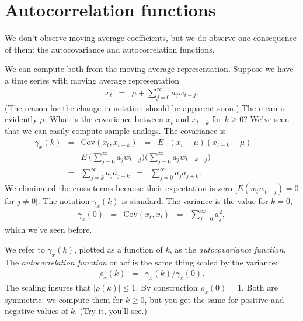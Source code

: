 \documentclass[11pt]{article}
\begin{document}
\section{Autocorrelation functions}

We don't observe moving average coefficients,
but we do observe one consequence of them:
the autocovariance and autocorrelation functions.


We can compute both from the moving average representation.
Suppose we have a time series with moving average representation
\begin{eqnarray*}
    x_t &=& \mu + \sum_{j=0}^\infty a_j w_{t-j} .
\end{eqnarray*}
(The reason for the change in notation should be apparent soon.)
The mean is evidently $\mu$.
What is the covariance between $x_t$ and $x_{t-k}$ for $k \geq 0$?
We've seen that we can easily compute sample analogs.
The covariance is
\begin{eqnarray*}
    \gamma_x(k)  &=& \mbox{Cov} (x_t,x_{t-k}) \;\;=\;\;
                 E \left[ (x_t - \mu) (x_{t-k} - \mu)\right] \phantom{\sum}\\
                &=&  E \ \Big( \sum_{j=0}^\infty a_j w_{t-j} \Big)
                  \Big( \sum_{j=0}^\infty a_j w_{t-k-j} \Big) \\
                &=&   \sum_{j=k}^\infty a_j a_{j-k}
                \;\;=\;\; \sum_{j=0}^\infty a_j a_{j+k} .
\end{eqnarray*}
We eliminated the cross terms because their expectation is zero
[$E (w_t w_{t-j}) = 0$ for $j\neq 0$].
The notation $\gamma_x(k)$ is standard.
The variance is the value for $k=0$,
\begin{eqnarray}
    \gamma_x(0)  &=& \mbox{Cov} (x_t,x_{t})
                \;\;=\;\;   \sum_{j=0}^\infty a_j^2  ,
                \label{eq:acf-from-ma}
\end{eqnarray}
which we've seen before.

We refer to $\gamma_x(k)$, plotted as a function of $k$,
as the {\it autocovariance function\/}.
The {\it autocorrelation function\/} or acf is the same thing scaled by the variance:
\begin{eqnarray*}
    \rho_x(k)  &=& \gamma_x(k)/\gamma_x(0) .
\end{eqnarray*}
The scaling insures that $|\rho(k)| \leq 1$.
By construction $\rho_x(0) = 1$.
Both are symmetric:  we compute them for $k\geq 0$,
but you get the same for positive and negative values of $k$.
(Try it, you'll see.)
\end{document}
